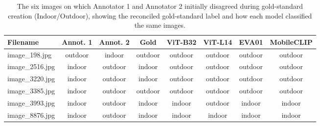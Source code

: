 \documentclass[hidelinks, 11pt]{article}
\begin{document}
\begin{table}[htbp]
\centering
\caption{The six images on which Annotator 1 and Annotator 2 initially disagreed during gold-standard creation (Indoor/Outdoor), showing the reconciled gold-standard label and how each model classified the same images.}
\label{tab:reconciled_disagreements_indooroutdoor}
\begin{tabular}{@{}lccccccc@{}}
\toprule
\textbf{Filename} & \textbf{Annot. 1} & \textbf{Annot. 2} & \textbf{Gold} & \textbf{ViT-B32} & \textbf{ViT-L14} & \textbf{EVA01} & \textbf{MobileCLIP} \\
\midrule
image\_198.jpg  & outdoor & indoor  & outdoor & outdoor & outdoor & outdoor & outdoor \\
image\_2516.jpg & indoor  & outdoor & indoor  & outdoor & outdoor & outdoor & outdoor \\
image\_3220.jpg & indoor  & outdoor & indoor  & outdoor & outdoor & outdoor & outdoor \\
image\_3385.jpg & indoor  & outdoor & outdoor & outdoor & outdoor & outdoor & outdoor \\
image\_3993.jpg & indoor  & outdoor & indoor  & indoor  & outdoor & indoor  & indoor  \\
image\_8876.jpg & indoor  & outdoor & indoor  & indoor  & indoor  & indoor  & indoor  \\
\bottomrule
\end{tabular}
\end{table}
\end{document}
